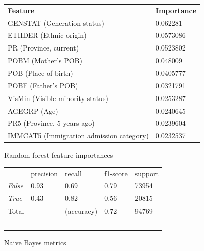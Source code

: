 \documentclass[10pt, conference, compsocconf]{IEEEtran}
\begin{document}
\begin{figure}
  \begin{tabular}{ll}
    \textbf{Feature}                          & \textbf{Importance} \\
    GENSTAT (Generation status)               & 0.062281 \\
    ETHDER (Ethnic origin)                    & 0.0573086 \\
    PR (Province, current)                    & 0.0523802 \\
    POBM (Mother's POB)                       & 0.048009 \\
    POB (Place of birth)                      & 0.0405777 \\
    POBF (Father's POB)                       & 0.0321791 \\
    VisMin (Visible minority status)          & 0.0253287 \\
    AGEGRP (Age)                              & 0.0240645 \\
    PR5 (Province, 5 years ago)               & 0.0239604 \\
    IMMCAT5 (Immigration admission category)  & 0.0232537
  \end{tabular}
  \caption{Random forest feature importances}
  \label{fig:random_forest_importances}
\end{figure}

\begin{figure}
  \begin{tabular}{lllll}
                  & precision & recall      & f1-score  & support \\
  \textit{False}  & 0.93      & 0.69        & 0.79      & 73954 \\
  \textit{True}   & 0.43      & 0.82        & 0.56      & 20815 \\
  Total           &           & (accuracy)  & 0.72      & 94769 \\\
  \end{tabular}
  \caption{Naive Bayes metrics}
  \label{fig:naive_bayes_metrics}
\end{figure}
\end{document}
